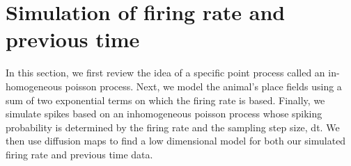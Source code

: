 
\section{Simulation of firing rate and previous time}
In this section, we first review the idea of a specific point process
called an in-homogeneous poisson process.
Next, we model the animal's place fields using a sum of two exponential terms
on which the firing rate is based.
Finally, we simulate spikes based on an inhomogeneous poisson process whose
spiking probability is determined by the firing rate and the sampling step size, dt.
We then use diffusion maps to find a low dimensional model for both our simulated firing rate and previous time data.